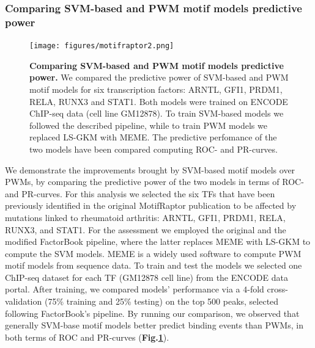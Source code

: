 \documentclass[a4paper, titlepage, openright]{book}
\newcommand{\motifraptor}{MotifRaptor\xspace}
\begin{document}
\subsubsection{Comparing SVM-based and PWM motif models predictive power}
\begin{figure}
	\centering
	\texttt{[image: figures/motifraptor2.png]}
	\caption[Comparing SVM-based and PWM motif models predictive power]{\textbf{Comparing SVM-based and PWM motif models predictive power.} We compared the predictive power of SVM-based and PWM motif models for six transcription factors: ARNTL, GFI1, PRDM1, RELA, RUNX3 and STAT1. Both models were trained on ENCODE ChIP-seq data (cell line GM12878). To train SVM-based models we followed the described pipeline, while to train PWM models we replaced LS-GKM with MEME. The predictive perfomance of the two models have been compared computing ROC- and PR-curves.}
	\label{fig:motifraptor2}
\end{figure} 
We demonstrate the improvements brought by SVM-based motif models over PWMs, by comparing the predictive power of the two models in terms of ROC- and PR-curves. For this analysis we selected the six TFs that have been previously identified in the original \motifraptor publication to be affected by mutations linked to rheumatoid arthritis: ARNTL, GFI1, PRDM1, RELA, RUNX3, and STAT1. For the assessment we employed the original and the modified FactorBook pipeline, where the latter replaces MEME with LS-GKM to compute the SVM models. MEME \citep{bailey1994fitting} is a widely used software to compute PWM motif models from sequence data. To train and test the models we selected one ChIP-seq dataset for each TF (GM12878 cell line) from the ENCODE data portal. After training, we compared models' performance via a $4$-fold cross-validation (75\% training and 25\% testing) on the top 500 peaks, selected following FactorBook's pipeline. By running our comparison, we observed that generally SVM-base motif models better predict binding events than PWMs, in both terms of ROC and PR-curves (\textbf{Fig.\ref{fig:motifraptor2}}).
\end{document}
